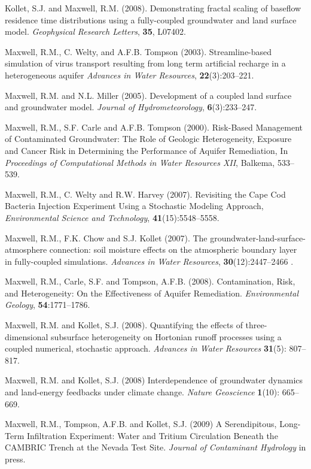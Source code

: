 \begin{thebibliography}{99}
Kollet, S.J. and Maxwell, R.M. (2008). Demonstrating fractal scaling of baseflow residence time distributions using a fully-coupled groundwater and land surface model. {\em Geophysical Research Letters}, {\bf 35}, L07402. 

 Maxwell, R.M., C. Welty, and A.F.B. Tompson (2003).
Streamline-based simulation of virus transport resulting from long term
artificial recharge in a heterogeneous aquifer {\em Advances in Water
Resources}, {\bf 22}(3):203--221.

Maxwell, R.M. and N.L. Miller (2005). Development of a coupled land surface and groundwater model.  {\em Journal of Hydrometeorology}, {\bf 6}(3):233--247.

Maxwell, R.M., S.F. Carle and A.F.B. Tompson (2000). Risk-Based Management of Contaminated Groundwater: The Role of Geologic Heterogeneity, Exposure and Cancer Risk in Determining the Performance of Aquifer Remediation, In {\em Proceedings of Computational Methods in Water Resources XII}, Balkema, 533--539.

 Maxwell, R.M., C. Welty and R.W. Harvey (2007). Revisiting the Cape Cod Bacteria Injection Experiment Using a Stochastic Modeling Approach, {\em Environmental Science and Technology}, { \bf 41}(15):5548--5558.

Maxwell, R.M., F.K. Chow and S.J. Kollet (2007). The groundwater-land-surface-atmosphere connection: soil moisture effects on the atmospheric boundary layer in fully-coupled simulations. {\em Advances in Water Resources}, {\bf 30}(12):2447--2466 .

Maxwell, R.M., Carle, S.F. and Tompson, A.F.B. (2008).
Contamination, Risk, and Heterogeneity: On the Effectiveness of Aquifer Remediation. {\em Environmental Geology}, {\bf 54}:1771--1786.

Maxwell, R.M. and Kollet, S.J. (2008). Quantifying the effects of three-dimensional subsurface heterogeneity on Hortonian runoff processes using a coupled numerical, stochastic approach. {\em Advances in Water Resources} {\bf 31}(5): 807--817. 

Maxwell, R.M. and Kollet, S.J. (2008) Interdependence of groundwater dynamics and land-energy feedbacks under climate change. {\em Nature Geoscience} {\bf 1}(10): 665--669.

Maxwell, R.M., Tompson, A.F.B. and Kollet, S.J. (2009) A Serendipitous, Long-Term Infiltration Experiment: Water and Tritium Circulation Beneath the CAMBRIC Trench at the Nevada Test Site. {\em Journal of Contaminant Hydrology} in press.


\end{thebibliography}
